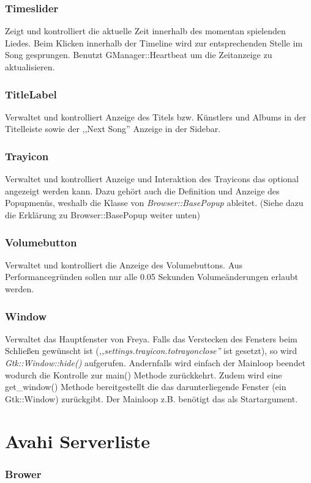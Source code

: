 \subsubsection{Timeslider}
Zeigt und kontrolliert die aktuelle Zeit innerhalb des momentan spielenden Liedes.
Beim Klicken innerhalb der Timeline wird zur entsprechenden Stelle im Song gesprungen.
Benutzt GManager::Heartbeat um die Zeitanzeige zu aktualisieren.

\subsubsection{TitleLabel}
Verwaltet und kontrolliert Anzeige des Titels bzw. Künstlers und Albums in der Titelleiste sowie der ,,Next Song'' Anzeige in der Sidebar.

\subsubsection{Trayicon}
Verwaltet und kontrolliert Anzeige und Interaktion des Trayicons das optional angezeigt werden kann.
Dazu gehört auch die Definition und Anzeige des Popupmenüs, weshalb die Klasse von \textit{Browser::BasePopup} ableitet.
(Siehe dazu die Erklärung zu Browser::BasePopup weiter unten)

\subsubsection{Volumebutton}
Verwaltet und kontrolliert die Anzeige des Volumebuttons. Aus Performancegründen sollen nur alle 0.05 Sekunden Volumeänderungen erlaubt werden.

\subsubsection{Window}
Verwaltet das Hauptfenster von Freya.
Falls das Verstecken des Fensters beim Schließen gewünscht ist (\emph{,,settings.trayicon.totrayonclose''} ist gesetzt),
so wird \emph{Gtk::Window::hide()} aufgerufen.
Andernfalls wird einfach der Mainloop beendet wodurch die Kontrolle zur main() Methode zurückkehrt.
Zudem wird eine get\_window() Methode bereitgestellt die das darunterliegende Fenster (ein Gtk::Window) zurückgibt.
Der Mainloop z.B. benötigt das als Startargument.
\section{Avahi Serverliste}
\subsubsection{Brower}

